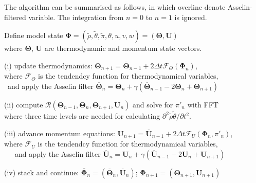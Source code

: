 \documentclass[a4paper,11pt]{article}
\begin{document}
The algorithm can be summarised as follows, in which overline denote Asselin-filtered variable. The integration from $n=0$ to $n=1$ is ignored.

\begin{algorithm}
\begin{tcolorbox}[parbox=false, width=38em]

    Define model state $\mathbf{\Phi} = (\tilde{\rho},\tilde{\theta},\tilde{\pi},\theta,u,v,w) = (\mathbf{\Theta}, \mathbf{U})$\\[-1ex]         
    \qquad where $\mathbf{\Theta}$, $\mathbf{U}$ are thermodynamic and momentum state vectors.\\
    
     {
        (i) update thermodynamics: $\mathbf{\Theta}_{n+1} = \overline{\mathbf{\Theta}}_{n-1} + 2\Delta t \mathcal{F}_{\Theta}(\mathbf{\Phi}_n)$,\\[-1ex]
        \qquad where $\mathcal{F}_{\Theta}$ is the tendendcy function for thermodynamical variables,\\[-1ex]
        \quad\ and apply the Asselin filter $\overline{\mathbf{\Theta}}_n = \mathbf{\Theta}_n + \gamma (\overline{\mathbf{\Theta}}_{n-1} - 2\mathbf{\Theta}_n + \mathbf{\Theta}_{n+1})$
        
        (ii) compute $\mathcal{R}(\overline{\mathbf{\Theta}}_{n-1}, \overline{\mathbf{\Theta}}_{n}, \mathbf{\Theta}_{n+1}, \mathbf{U}_n)$ and solve for $\pi'_{n}$ with FFT\\[-1ex]
        \qquad where three time levels are needed for calculating $\partial^2\tilde{\rho}\tilde{\theta}/\partial t^2$. 
        
        (iii) advance momentum equations: $\mathbf{U}_{n+1} = \overline{\mathbf{U}}_{n-1} + 2\Delta t \mathcal{F}_{U}(\mathbf{\Phi}_n, \pi'_n)$,\\[-1ex]
        \qquad  where $\mathcal{F}_{U}$ is the tendendcy function for thermodynamical variables,\\[-1ex]
        \quad\ \ \ and apply the Asselin filter $\overline{\mathbf{U}}_n = \mathbf{U}_n + \gamma (\overline{\mathbf{U}}_{n-1} - 2\mathbf{U}_n + \mathbf{U}_{n+1})$    
        
        (iv) stack and continue: $\overline{\mathbf{\Phi}}_n = (\overline{\mathbf{\Theta}}_n, \overline{\mathbf{U}}_n)$; $\mathbf{\Phi}_{n+1} = (\mathbf{\Theta}_{n+1}, \mathbf{U}_{n+1})$
        }        
\end{tcolorbox}    
\end{algorithm}
\end{document}
